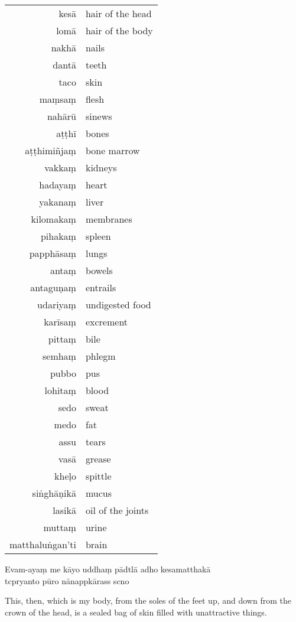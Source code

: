 \begin{tabular}{r l}
kesā            & hair of the head \\
lomā            & hair of the body \\
nakhā           & nails \\
dantā           & teeth \\
taco            & skin \\
maṃsaṃ          & flesh \\
nahārū          & sinews \\
aṭṭhī           & bones \\
aṭṭhimiñjaṃ     & bone marrow \\
vakkaṃ          & kidneys \\
hadayaṃ         & heart \\
yakanaṃ         & liver \\
kilomakaṃ       & membranes \\
pihakaṃ         & spleen \\
papphāsaṃ       & lungs \\
antaṃ           & bowels \\
antaguṇaṃ       & entrails \\
udariyaṃ        & undigested food \\
karīsaṃ         & excrement \\
pittaṃ          & bile \\
semhaṃ          & phlegm \\
pubbo           & pus \\
lohitaṃ         & blood \\
sedo            & sweat \\
medo            & fat \\
assu            & tears \\
vasā            & grease \\
kheḷo           & spittle \\
siṅghāṇikā      & mucus \\
lasikā          & oil of the joints \\
muttaṃ          & urine \\
matthaluṅgan'ti & brain \\
\end{tabular}

Evam-ayaṃ me kāyo uddhaṃ pādtlā adho kesamatthakā\\
tcpryanto pūro nānappkārass scno

\begin{english}
  This, then, which is my body, from the soles of the feet up, and down from the crown of the head, is a sealed bag of skin filled with unattractive things.
\end{english}

